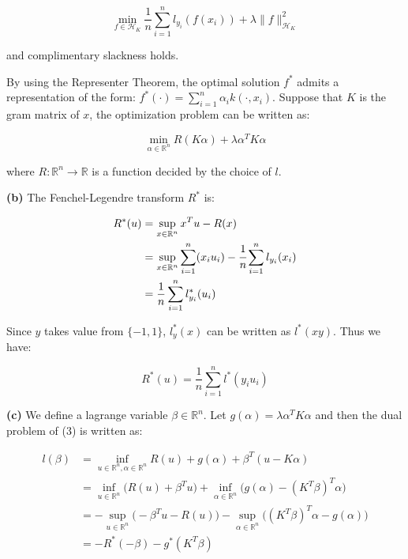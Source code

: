 \documentclass[11pt]{article}
\begin{document}
    \vspace{-3em}
    $$
    \min_{f \in \mathcal{H}_K} \frac{1}{n} \sum_{i=1}^n l_{y_i} (f(x_i)) + \lambda \|f\|_{\mathcal{H}_K}^2
    $$
    \vspace{-3em}

    and complimentary slackness holds. 
    
    By using the Representer Theorem, the optimal solution $f^*$ admits a representation of the form:
    $f^* (\cdot) = \sum_{i=1}^n \alpha_i k(\cdot, x_i)$. Suppose that $K$ is the gram matrix of $x$, the optimization problem can be written as:

    \vspace{-3em}
    $$
    \min_{\alpha \in \mathbb{R}^n} R(K\alpha) + \lambda \alpha^T K \alpha
    $$
    \vspace{-3em}

    where $R: \mathbb{R}^n \to \mathbb{R}$ is a function decided by the choice of $l$.

    \textbf{(b)} The Fenchel-Legendre transform $R^*$ is:

    \vspace{-4em}
    \begin{align*}
      R^* (u) &= \sup_{x \in \mathbb{R}^n} x^T u - R(x) \\
      &= \sup_{x \in \mathbb{R}^n} \sum_{i=1}^n ( x_i u_i ) - \cfrac{1}{n} \sum_{i=1}^n l_{y_i} (x_i)\\ 
      &= \frac{1}{n} \sum_{i=1}^n l_{y_i}^* (u_i) 
    \end{align*}
    \vspace{-4em}

    Since $y$ takes value from $\{-1, 1\}$, $l^*_{y} (x)$ can be written as $l^* (xy)$. Thus we have:

    \vspace{-3em}
    $$
    R^* (u) = \frac{1}{n} \sum_{i=1}^n l^* (y_i u_i) 
    $$
    \vspace{-3em}


    \textbf{(c)} We define a lagrange variable $\beta \in \mathbb{R}^n$. Let $g(\alpha) = \lambda \alpha^T K \alpha$ and then the dual problem of (3) is written as:

    \vspace{-4em}
    \begin{align*}
    l(\beta) &= \inf_{u \in \mathbb{R}^n, \alpha \in \mathbb{R}^n} R(u) + g(\alpha) + \beta^T (u - K\alpha) \\
    &= \inf_{u \in \mathbb{R}^n} \big ( R(u) + \beta^T u \big ) + \inf_{\alpha \in \mathbb{R}^n} \big ( g(\alpha) - (K^T \beta)^T \alpha \big ) \\
    &= -\sup_{u \in \mathbb{R}^n} \big ( - \beta^T u - R(u) \big ) - \sup_{\alpha \in \mathbb{R}^n} \big ( (K^T \beta)^T \alpha - g(\alpha)  \big ) \\
    &= -R^* (-\beta) - g^* (K^T \beta)
    \end{align*}
    \vspace{-4em}
\end{document}
